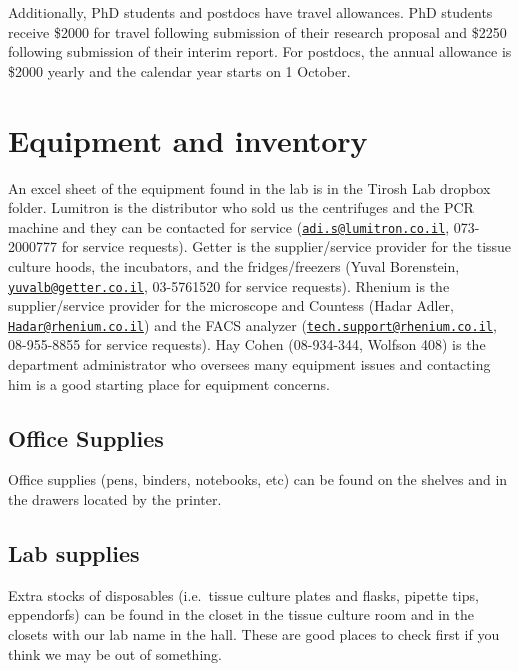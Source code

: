 \documentclass[]{book}
\begin{document}
Additionally, PhD students and postdocs have travel allowances. PhD
students receive \$2000 for travel following submission of their
research proposal and \$2250 following submission of their interim
report. For postdocs, the annual allowance is \$2000 yearly and the
calendar year starts on 1 October.

\chapter{Equipment and inventory}\label{equipment}

An excel sheet of the equipment found in the lab is in the Tirosh Lab
dropbox folder. Lumitron is the distributor who sold us the centrifuges
and the PCR machine and they can be contacted for service
(\href{mailto:adi.s@lumitron.co.il}{\nolinkurl{adi.s@lumitron.co.il}},
073-2000777 for service requests). Getter is the supplier/service
provider for the tissue culture hoods, the incubators, and the
fridges/freezers (Yuval Borenstein,
\href{mailto:yuvalb@getter.co.il}{\nolinkurl{yuvalb@getter.co.il}},
03-5761520 for service requests). Rhenium is the supplier/service
provider for the microscope and Countess (Hadar Adler,
\href{mailto:Hadar@rhenium.co.il}{\nolinkurl{Hadar@rhenium.co.il}}) and
the FACS analyzer
(\href{mailto:tech.support@rhenium.co.il}{\nolinkurl{tech.support@rhenium.co.il}},
08-955-8855 for service requests). Hay Cohen (08-934-344, Wolfson 408)
is the department administrator who oversees many equipment issues and
contacting him is a good starting place for equipment concerns.

\section{Office Supplies}\label{office-supplies-1}

Office supplies (pens, binders, notebooks, etc) can be found on the
shelves and in the drawers located by the printer.

\section{Lab supplies}\label{lab-supplies}

Extra stocks of disposables (i.e.~tissue culture plates and flasks,
pipette tips, eppendorfs) can be found in the closet in the tissue
culture room and in the closets with our lab name in the hall. These are
good places to check first if you think we may be out of something.
\end{document}
